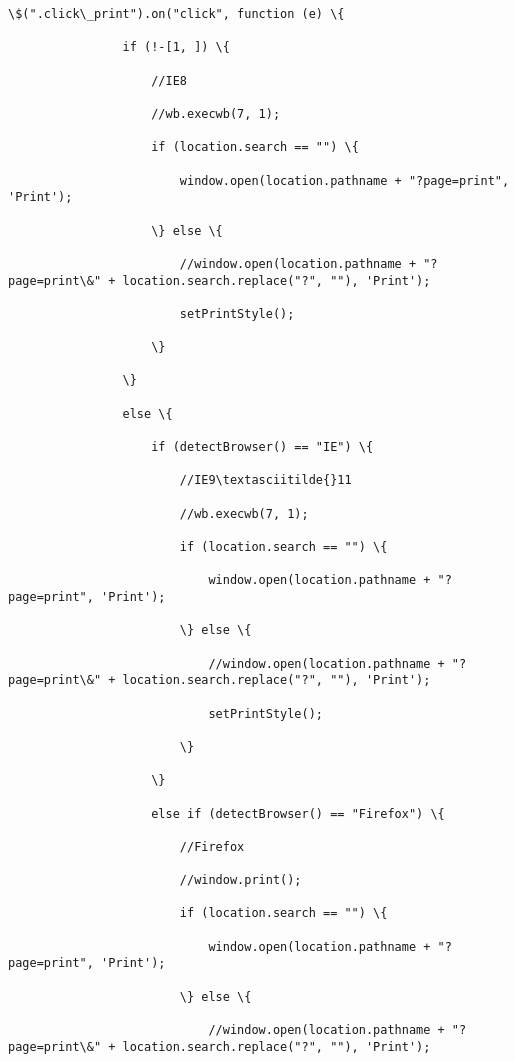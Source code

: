 \documentclass[11pt]{article}
\begin{document}
\begin{Verbatim}[commandchars=\\\{\}]
            \$(".click\_print").on("click", function (e) \{

                if (!-[1, ]) \{

                    //IE8

                    //wb.execwb(7, 1);

                    if (location.search == "") \{

                        window.open(location.pathname + "?page=print", 'Print');

                    \} else \{

                        //window.open(location.pathname + "?page=print\&" + location.search.replace("?", ""), 'Print');

                        setPrintStyle();

                    \}

                \}

                else \{

                    if (detectBrowser() == "IE") \{

                        //IE9\textasciitilde{}11

                        //wb.execwb(7, 1);

                        if (location.search == "") \{

                            window.open(location.pathname + "?page=print", 'Print');

                        \} else \{

                            //window.open(location.pathname + "?page=print\&" + location.search.replace("?", ""), 'Print');

                            setPrintStyle();

                        \}

                    \}

                    else if (detectBrowser() == "Firefox") \{

                        //Firefox

                        //window.print();

                        if (location.search == "") \{

                            window.open(location.pathname + "?page=print", 'Print');

                        \} else \{

                            //window.open(location.pathname + "?page=print\&" + location.search.replace("?", ""), 'Print');


\end{Verbatim}
\end{document}
